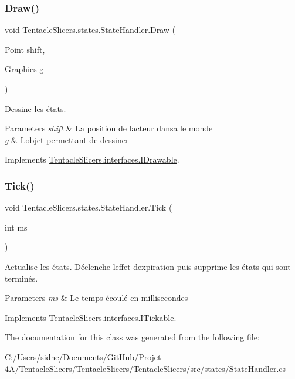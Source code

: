\subsubsection{\texorpdfstring{Draw()}{Draw()}}
{\footnotesize\ttfamily void Tentacle\+Slicers.\+states.\+State\+Handler.\+Draw (\begin{DoxyParamCaption}\item[{Point}]{shift,  }\item[{Graphics}]{g }\end{DoxyParamCaption})}



Dessine les états. 


\begin{DoxyParams}{Parameters}
{\em shift} & La position de l\textquotesingle{}acteur dansa le monde \\
\hline
{\em g} & L\textquotesingle{}objet permettant de dessiner \\
\hline
\end{DoxyParams}


Implements \hyperlink{interface_tentacle_slicers_1_1interfaces_1_1_i_drawable}{Tentacle\+Slicers.\+interfaces.\+I\+Drawable}.

\mbox{\label{class_tentacle_slicers_1_1states_1_1_state_handler_a007cd3d4ed0d6cef46abac47a512a4bc}} 
\subsubsection{\texorpdfstring{Tick()}{Tick()}}
{\footnotesize\ttfamily void Tentacle\+Slicers.\+states.\+State\+Handler.\+Tick (\begin{DoxyParamCaption}\item[{int}]{ms }\end{DoxyParamCaption})}



Actualise les états. Déclenche l\textquotesingle{}effet d\textquotesingle{}expiration puis supprime les états qui sont terminés. 


\begin{DoxyParams}{Parameters}
{\em ms} & Le temps écoulé en millisecondes \\
\hline
\end{DoxyParams}


Implements \hyperlink{interface_tentacle_slicers_1_1interfaces_1_1_i_tickable}{Tentacle\+Slicers.\+interfaces.\+I\+Tickable}.



The documentation for this class was generated from the following file\+:\begin{DoxyCompactItemize}
\item 
C\+:/\+Users/sidne/\+Documents/\+Git\+Hub/\+Projet 4\+A/\+Tentacle\+Slicers/\+Tentacle\+Slicers/\+Tentacle\+Slicers/src/states/State\+Handler.\+cs\end{DoxyCompactItemize}
